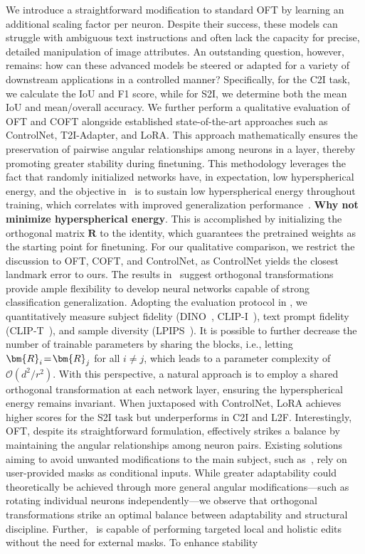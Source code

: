 We introduce a straightforward modification to standard OFT by learning an additional scaling factor per neuron. Despite their success, these models can struggle with ambiguous text instructions and often lack the capacity for precise, detailed manipulation of image attributes. An outstanding question, however, remains: how can these advanced models be steered or adapted for a variety of downstream applications in a controlled manner? Specifically, for the C2I task, we calculate the IoU and F1 score, while for S2I, we determine both the mean IoU and mean/overall accuracy. We further perform a qualitative evaluation of OFT and COFT alongside established state-of-the-art approaches such as ControlNet, T2I-Adapter, and LoRA. This approach mathematically ensures the preservation of pairwise angular relationships among neurons in a layer, thereby promoting greater stability during finetuning. This methodology leverages the fact that randomly initialized networks have, in expectation, low hyperspherical energy, and the objective in~\cite{liu2021orthogonal} is to sustain low hyperspherical energy throughout training, which correlates with improved generalization performance~\cite{liu2018learning,lin2020regularizing}. \textbf{Why not minimize hyperspherical energy}. This is accomplished by initializing the orthogonal matrix $\bm{R}$ to the identity, which guarantees the pretrained weights as the starting point for finetuning. For our qualitative comparison, we restrict the discussion to OFT, COFT, and ControlNet, as ControlNet yields the closest landmark error to ours. The results in~\cite{liu2021orthogonal} suggest orthogonal transformations provide ample flexibility to develop neural networks capable of strong classification generalization. Adopting the evaluation protocol in \cite{ruiz2023dreambooth}, we quantitatively measure subject fidelity (DINO~\cite{caron2021emerging}, CLIP-I~\cite{radford2021learning}), text prompt fidelity (CLIP-T~\cite{radford2021learning}), and sample diversity (LPIPS~\cite{zhang2018unreasonable}). It is possible to further decrease the number of trainable parameters by sharing the blocks, i.e., letting $\thickmuskip=2mu \medmuskip=2mu \bm{R}_i = \bm{R}_j$ for all $i\neq j$, which leads to a parameter complexity of $\mathcal{O}(d^2/r^2)$. With this perspective, a natural approach is to employ a shared orthogonal transformation at each network layer, ensuring the hyperspherical energy remains invariant. When juxtaposed with ControlNet, LoRA achieves higher scores for the S2I task but underperforms in C2I and L2F. Interestingly, OFT, despite its straightforward formulation, effectively strikes a balance by maintaining the angular relationships among neuron pairs. Existing solutions aiming to avoid unwanted modifications to the main subject, such as~\cite{avrahami2022blended,nichol2022glide}, rely on user-provided masks as conditional inputs. While greater adaptability could theoretically be achieved through more general angular modifications—such as rotating individual neurons independently—we observe that orthogonal transformations strike an optimal balance between adaptability and structural discipline. Further,~\cite{hertz2022prompt} is capable of performing targeted local and holistic edits without the need for external masks. To enhance stability 